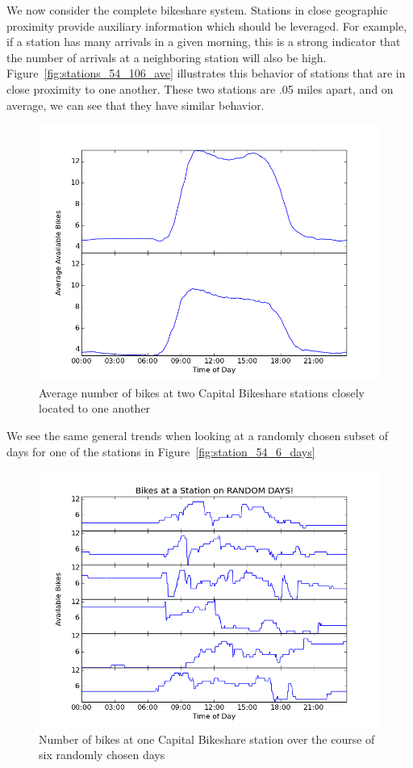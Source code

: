 \documentclass{acm_proc_article-sp}
\begin{document}
We now consider the complete bikeshare system.  Stations in close geographic proximity provide auxiliary information which should be leveraged.  For example, if a station has many arrivals in a given morning, this is a strong indicator that the number of arrivals at a neighboring station will also be high. Figure~\ref{fig:stations_54_106_ave}  illustrates this behavior of stations that are in close proximity to one another. These two stations are .05 miles apart, and on average, we can see that they have similar behavior.
\begin{figure} [!h]
\caption{Average number of bikes at two Capital Bikeshare stations closely located to one another}
\centering
\includegraphics[scale = 0.4]{stations_54_106_ave.png}
\end{figure}
We see the same general trends when looking at a randomly chosen subset of days for one of the stations in Figure~\ref{fig:station_54_6_days}
\begin{figure} [!h]
\caption{Number of bikes at one Capital Bikeshare station over the course of six randomly chosen days}
\centering
\includegraphics[scale = 0.4]{station_54_6_days.png}
\end{figure}
\end{document}
